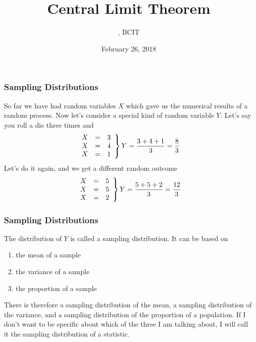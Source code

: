 \documentclass[xcolor=dvipsnames]{beamer}
\title{Central Limit Theorem}
\subtitle{{\CourseNumber}, BCIT}
\author{\CourseName}
\date{February 26, 2018}
\begin{document}
\begin{frame}
  \titlepage
\end{frame}

\begin{frame}
  \frametitle{Sampling Distributions}
So far we have had random variables $X$ which gave us the numerical
results of a random process. Now let's consider a special kind of
random variable $Y$. Let's say you roll a die three times and
\begin{equation}
  \label{eq:quaegieg}
  \left.\begin{array}{rcl}
    X&=&3 \\
    X&=&4 \\
    X&=&1
  \end{array}\right\}Y=\frac{3+4+1}{3}=\frac{8}{3}\notag
\end{equation}
Let's do it again, and we get a different random outcome
\begin{equation}
  \label{eq:iitiloox}
  \left.\begin{array}{rcl}
    X&=&5 \\
    X&=&5 \\
    X&=&2
  \end{array}\right\}Y=\frac{5+5+2}{3}=\frac{12}{3}\notag
\end{equation}
\end{frame}

\begin{frame}
  \frametitle{Sampling Distributions}
The distribution of $Y$ is called a \alert{sampling distribution}. It
can be based on 
\begin{enumerate}
\item the \alert{mean} of a sample
\item the \alert{variance} of a sample
\item the \alert{proportion} of a sample
\end{enumerate}
There is therefore a sampling distribution of the mean, a sampling
distribution of the variance, and a sampling distribution of the
proportion of a population. If I don't want to be specific about which
of the three I am talking about, I will call it the sampling
distribution of a \alert{statistic}.
\end{frame}
\end{document}
